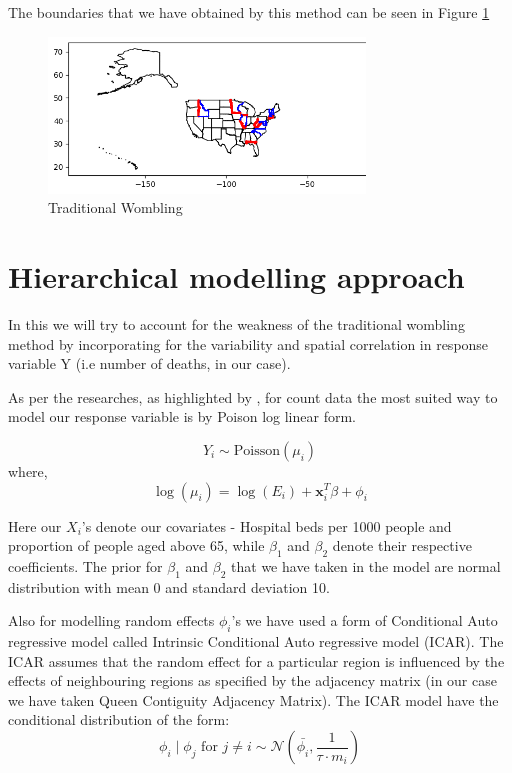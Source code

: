 \documentclass[enabledeprecatedfontcommands,parskip=half,twoside=semi,BCOR=0mm]{scrreprt}
\numberwithin{equation}{chapter}
\theoremstyle{definition}
\theoremstyle{remark}
\begin{document}
    The boundaries that we have obtained by this method can be seen in Figure \ref{fig:Figure 3}
    \begin{figure}[h]
    \centering
    \includegraphics[width=0.75\textwidth]{Traditional.png}
    \caption{Traditional Wombling}
    \label{fig:Figure 3}
    \end{figure}
    
    \section{Hierarchical modelling approach}
    
    In this we will try to account for the weakness of the traditional wombling method by incorporating for the variability and spatial correlation in response variable Y (i.e number of deaths, in our case).
    
    As per the researches, as highlighted by \cite{Lu_Carlin.2005}, for count data the most suited way to model our response variable is by Poison log linear form.
    
    \[ Y_i \sim \text{Poisson}(\mu_i) \]
    where,
    \[
    \log(\mu_i) = \log(E_i) + \mathbf{x}_i^T \beta + \phi_i
    \]
    
    Here our \(X_i\)'s denote our covariates - Hospital beds per 1000 people and proportion of people aged above 65, while \(\beta_1\) and \(\beta_2\) denote their respective coefficients. The prior for \(\beta_1\) and \(\beta_2\) that we have taken in the model are normal distribution with mean 0 and standard deviation 10.
    
    Also for modelling random effects \(\phi_i\)'s we have used a form of Conditional Auto regressive model called Intrinsic Conditional Auto regressive model (ICAR). The ICAR assumes that the random effect for a particular region is influenced by the effects of neighbouring regions as specified by the adjacency matrix (in our case we have taken Queen Contiguity Adjacency Matrix). The ICAR model have the conditional distribution of the form:
    \[
    \phi_i \mid \phi_j \text{ for } j \neq i \sim \mathcal{N}\left(\bar{\phi_i}, \frac{1}{\tau \cdot m_i}\right)
    \]
\end{document}
